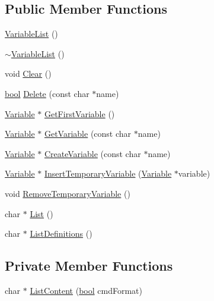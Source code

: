 \subsection*{Public Member Functions}
\begin{DoxyCompactItemize}
\item 
\hyperlink{classVariableList_ab1d9c24d3b93598ee87bc47c9b964ec0}{Variable\+List} ()
\item 
\hyperlink{classVariableList_aade67c5eeb8f3516b6b1f10da7096ba2}{$\sim$\+Variable\+List} ()
\item 
void \hyperlink{classVariableList_adef9da37cea5f80b9f2cdc899b3235c2}{Clear} ()
\item 
\hyperlink{platform_8h_a1062901a7428fdd9c7f180f5e01ea056}{bool} \hyperlink{classVariableList_a6f9e2f3a5cb1f8b4e71b0d8123e98264}{Delete} (const char $\ast$name)
\item 
\hyperlink{classVariable}{Variable} $\ast$ \hyperlink{classVariableList_a4b3bb4c1886ef7e0b15bfa5ecf4c52f4}{Get\+First\+Variable} ()
\item 
\hyperlink{classVariable}{Variable} $\ast$ \hyperlink{classVariableList_a2002862abdb75e088e2dd6bf1e140be6}{Get\+Variable} (const char $\ast$name)
\item 
\hyperlink{classVariable}{Variable} $\ast$ \hyperlink{classVariableList_ac78b3d52283bec7cbd8e7e2d217e1608}{Create\+Variable} (const char $\ast$name)
\item 
\hyperlink{classVariable}{Variable} $\ast$ \hyperlink{classVariableList_a4e8c2b729d346ff56cf01c5349931c62}{Insert\+Temporary\+Variable} (\hyperlink{classVariable}{Variable} $\ast$variable)
\item 
void \hyperlink{classVariableList_a489608dbcd6989a9ffd4092234a8052c}{Remove\+Temporary\+Variable} ()
\item 
char $\ast$ \hyperlink{classVariableList_a8ddefb92c0c2f18f096f0fc4363d5af6}{List} ()
\item 
char $\ast$ \hyperlink{classVariableList_aa2726674491d8cd5625859f79df39c9d}{List\+Definitions} ()
\end{DoxyCompactItemize}
\subsection*{Private Member Functions}
\begin{DoxyCompactItemize}
\item 
char $\ast$ \hyperlink{classVariableList_a2898791757231a476a994741a0f8ab94}{List\+Content} (\hyperlink{platform_8h_a1062901a7428fdd9c7f180f5e01ea056}{bool} cmd\+Format)
\end{DoxyCompactItemize}
